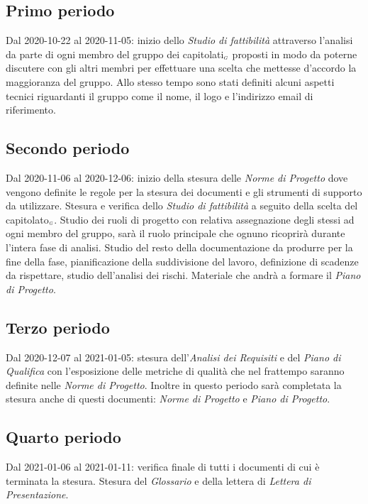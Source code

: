\subsection{Primo periodo}\label{PianificazioneAnalisiPrimoPeriodo}
Dal 2020-10-22 al 2020-11-05: inizio dello \textit{Studio di fattibilità} attraverso l'analisi da parte di ogni membro del gruppo dei capitolati$_{\scaleto{G}{3pt}}$ proposti in modo da poterne discutere con gli altri membri per effettuare una scelta che mettesse d'accordo la maggioranza del gruppo.
Allo stesso tempo sono stati definiti alcuni aspetti tecnici riguardanti il gruppo come il nome, il logo e l'indirizzo email di riferimento.
\subsection{Secondo periodo}\label{PianificazioneAnalisiSecondoPeriodo}
Dal 2020-11-06 al 2020-12-06: inizio della stesura delle \textit{Norme di Progetto} dove vengono definite le regole per la stesura dei documenti e gli strumenti di supporto da utilizzare. Stesura e verifica dello \textit{Studio di fattibilità} a seguito della scelta del capitolato$_{\scaleto{G}{3pt}}$.
Studio dei ruoli di progetto con relativa assegnazione degli stessi ad ogni membro del gruppo, sarà il ruolo principale che ognuno ricoprirà durante l'intera fase di analisi.
Studio del resto della documentazione da produrre per la fine della fase, pianificazione della suddivisione del lavoro, definizione di scadenze da rispettare, studio dell'analisi dei rischi. Materiale che andrà a formare il \textit{Piano di Progetto}.
\subsection{Terzo periodo}\label{PianificazioneAnalisiTerzoPeriodo}
Dal 2020-12-07 al 2021-01-05: stesura dell'\textit{Analisi dei Requisiti} e del \textit{Piano di Qualifica} con l'esposizione delle metriche di qualità che nel frattempo saranno definite nelle \textit{Norme di Progetto}. Inoltre in questo periodo sarà completata la stesura anche di questi documenti: \textit{Norme di Progetto} e \textit{Piano di Progetto}.
\subsection{Quarto periodo}\label{PianificazioneAnalisiQuartoPeriodo}
Dal 2021-01-06 al 2021-01-11: verifica finale di tutti i documenti di cui è terminata la stesura. Stesura del \textit{Glossario} e della lettera di \textit{Lettera di Presentazione}.
